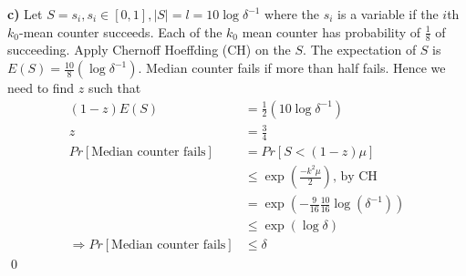 \documentclass[11pt]{article}
\begin{document}
\textbf{c)} Let $S = {s_i}, s_i\in [0,1], |S| = l = 10\log{\delta^{-1}}$ where the $s_i$ is a variable if the $i$th $k_0$-mean counter succeeds.
Each of the $k_0$ mean counter has probability of $\frac{1}{8}$ of succeeding. Apply Chernoff Hoeffding (CH) on the $S$. The expectation of $S$ is $E(S) = \frac{10}{8}(\log {\delta^{-1}})$. Median counter fails if more than half fails. Hence we need to find $z$ such that
\begin{align*}
(1-z) E(S) &= \frac{1}{2} (10\log{\delta^{-1}})\\
z &= \frac{3}{4} \\
Pr[\text{Median counter fails}] &= Pr[S <(1-z)\mu]\\
&\leq \exp(\frac{-k^2\mu}{2}) \text{, by CH}\\
&=\exp(-\frac{9}{16}\frac{10}{16}\log(\delta^{-1})) \\
&\leq \exp(\log\delta) \\
\Rightarrow Pr[\text{Median counter fails}] &\leq \delta
\end{align*}
\qed
\newpage
\end{document}
